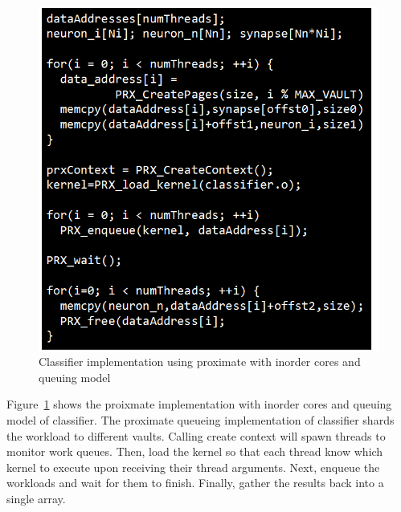 \begin{figure}
  \begin{center}
    \includegraphics[width=\linewidth]{cs758-figs/classifier-prx_inorder_q.png}
  \end{center}
\vspace{-0.2in}
  \caption{Classifier implementation using proximate with inorder cores and queuing model}
  \label{fig:classifier-prx_inorder_q}
\vspace{-0.05in}
\end{figure}

Figure~\ref{fig:classifier-prx_inorder_q} shows the proixmate implementation 
with inorder cores and queuing model of classifier. The proximate queueing 
implementation of classifier shards the 
workload to different vaults. Calling create context 
will spawn threads to monitor work queues. Then, load the kernel so that each thread
know which kernel to execute upon receiving their thread arguments. 
Next, enqueue the workloads and wait for them to finish. 
Finally, gather the results back into a single array. 


